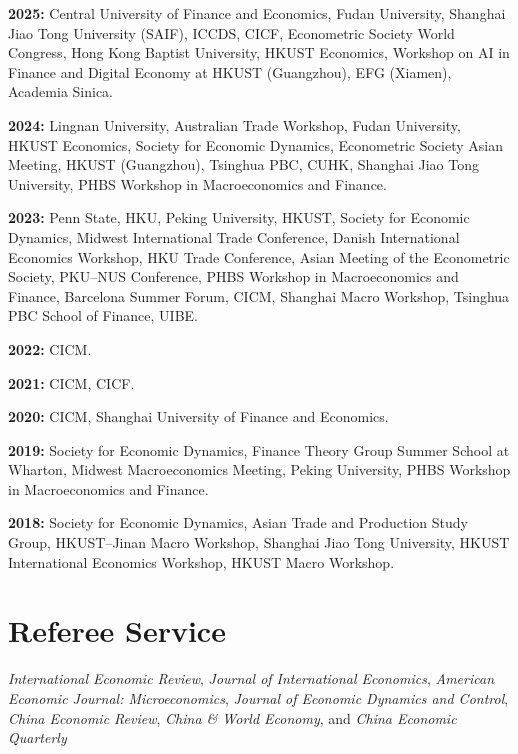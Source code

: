 \documentclass[11pt]{res}
\newcommand{\yearskip}{\par\vspace{0.08in}}
\begin{document}
\begin{resume}
\begin{minipage}{\linewidth}
\textbf{2025:} Central University of Finance and Economics,
Fudan University, Shanghai Jiao Tong University (SAIF), ICCDS,
CICF, Econometric Society World Congress, Hong Kong Baptist University,
HKUST Economics, Workshop on AI in Finance and Digital Economy at
HKUST (Guangzhou), EFG (Xiamen), Academia Sinica.
\yearskip

\textbf{2024:} Lingnan University, Australian Trade Workshop,
Fudan University, HKUST Economics, Society for Economic Dynamics,
Econometric Society Asian Meeting, HKUST (Guangzhou), Tsinghua PBC,
CUHK, Shanghai Jiao Tong University, PHBS Workshop in Macroeconomics
and Finance.
\yearskip

\textbf{2023:} Penn State, HKU, Peking University, HKUST,
Society for Economic Dynamics, Midwest International Trade Conference,
Danish International Economics Workshop, HKU Trade Conference,
Asian Meeting of the Econometric Society, PKU--NUS Conference,
PHBS Workshop in Macroeconomics and Finance, Barcelona Summer Forum,
CICM, Shanghai Macro Workshop, Tsinghua PBC School of Finance, UIBE.
\yearskip

\textbf{2022:} CICM.
\yearskip

\textbf{2021:} CICM, CICF.
\yearskip

\textbf{2020:} CICM, Shanghai University of Finance and Economics.
\yearskip

\textbf{2019:} Society for Economic Dynamics, Finance Theory Group Summer
School at Wharton, Midwest Macroeconomics Meeting, Peking University,
PHBS Workshop in Macroeconomics and Finance.
\yearskip

\textbf{2018:} Society for Economic Dynamics, Asian Trade and Production
Study Group, HKUST--Jinan Macro Workshop, Shanghai Jiao Tong University,
HKUST International Economics Workshop, HKUST Macro Workshop.
\end{minipage}

\section{\bf Referee Service}
\vspace{0.1in}
\hspace{-0.42in}\begin{minipage}{\linewidth}
\textit{International Economic Review},
\textit{Journal of International Economics},
\textit{American Economic Journal: Microeconomics},
\textit{Journal of Economic Dynamics and Control},
\textit{China Economic Review},
\textit{China \& World Economy}, and
\textit{China Economic Quarterly}
\end{minipage}


\end{resume}
\end{document}

